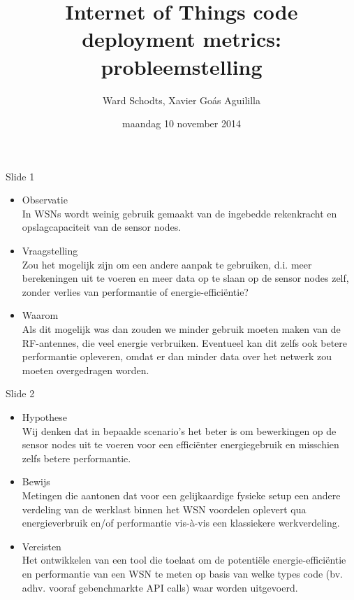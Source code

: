 \documentclass[presentation, bigger]{beamer}
\author{Ward Schodts, Xavier Goás Aguililla}
\date{maandag 10 november 2014}
\title{Internet of Things code deployment metrics: probleemstelling}
\let\otp\titlepage
\renewcommand{\titlepage}{\otp\addtocounter{framenumber}{-1}}
\begin{document}
\begin{frame}[plain]
 \titlepage
\end{frame}

\begin{frame}[label=sec-1]{Slide 1}
\begin{itemize}[<+->]
\item Observatie\\
In WSNs wordt weinig gebruik gemaakt van de ingebedde rekenkracht en
opslagcapaciteit van de sensor nodes.

\item Vraagstelling\\
Zou het mogelijk zijn om een andere aanpak te gebruiken, d.i. meer
berekeningen uit te voeren en meer data op te slaan op de sensor nodes
zelf, zonder verlies van performantie of energie-efficiëntie?
\item Waarom\\
Als dit mogelijk was dan zouden we minder gebruik moeten maken van de
RF-antennes, die veel energie verbruiken. Eventueel kan dit zelfs ook
betere performantie opleveren, omdat er dan minder data over het
netwerk zou moeten overgedragen worden.
\end{itemize}
\end{frame}
\begin{frame}[label=sec-2]{Slide 2}
\begin{itemize}[<+->]
\item Hypothese\\
Wij denken dat in bepaalde scenario's het beter is om bewerkingen op
de sensor nodes uit te voeren voor een efficiënter energiegebruik en
misschien zelfs betere performantie.
\item Bewijs\\
Metingen die aantonen dat voor een gelijkaardige fysieke setup een
andere verdeling van de werklast binnen het WSN voordelen oplevert qua
energieverbruik en/of performantie vis-à-vis een klassiekere
werkverdeling.
\item Vereisten\\
Het ontwikkelen van een tool die toelaat om de potentiële
energie-efficiëntie en performantie van een WSN te meten op basis
van welke types code (bv. adhv. vooraf gebenchmarkte API calls) waar
worden uitgevoerd.
\end{itemize}
\end{frame}
\end{document}
